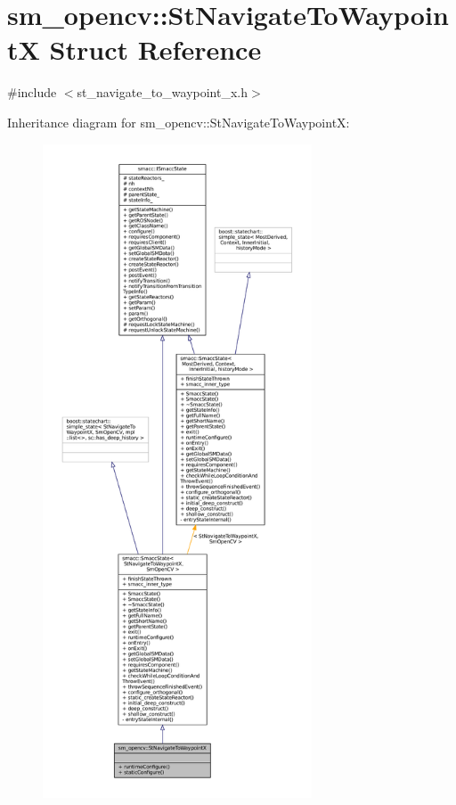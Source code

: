 \hypertarget{structsm__opencv_1_1StNavigateToWaypointX}{}\section{sm\+\_\+opencv\+:\+:St\+Navigate\+To\+WaypointX Struct Reference}
\label{structsm__opencv_1_1StNavigateToWaypointX}


{\ttfamily \#include $<$st\+\_\+navigate\+\_\+to\+\_\+waypoint\+\_\+x.\+h$>$}



Inheritance diagram for sm\+\_\+opencv\+:\+:St\+Navigate\+To\+WaypointX\+:
\nopagebreak
\begin{figure}[H]
\begin{center}
\leavevmode
\includegraphics[height=550pt]{structsm__opencv_1_1StNavigateToWaypointX__inherit__graph}
\end{center}
\end{figure}


